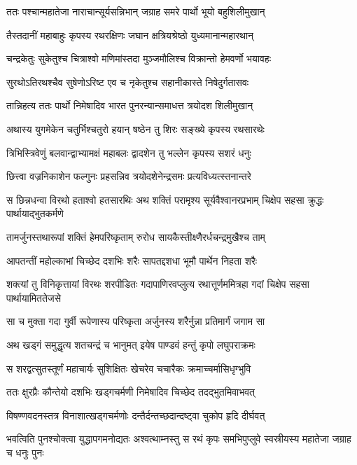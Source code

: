 \twolineshloka
{ततः पश्चान्महातेजा नाराचान्सूर्यसन्निभान्}
{जग्राह समरे पार्थो भूयो बहुशिलीमुखान्}


\twolineshloka
{तैस्तदानीं महाबाहुः कृपस्य रथरक्षिणः}
{जघान क्षत्रियश्रेष्ठो युध्यमानान्महारथान्}


\twolineshloka
{चन्द्रकेतुः सुकेतुश्च चित्राश्वो मणिमांस्तदा}
{मुञ्जमौलिश्च विक्रान्तो हेमवर्णो भयावहः}


\twolineshloka
{सुरथोऽतिरथश्चैव सुषेणोऽरिष्ट एव च}
{नृकेतुश्च सहानीकास्ते निषेदुर्गतासवः}


\twolineshloka
{तान्निहत्य ततः पार्थो निमेषादिव भारत}
{पुनरन्यान्समाधत्त त्रयोदश शिलीमुखान्}


\twolineshloka
{अथास्य युगमेकेन चतुर्भिश्चतुरो हयान्}
{षष्ठेन तु शिरः सङ्ख्ये कृपस्य रथसारथेः}


\twolineshloka
{त्रिभिस्त्रिवेणुं बलवान्द्वाभ्यामक्षं महाबलः}
{द्वादशेन तु भल्लेन कृपस्य सशरं धनुः}


\twolineshloka
{छित्त्वा वज्रनिकाशेन फल्गुनः प्रहसन्निव}
{त्रयोदशेनेन्द्रसमः प्रत्यविध्यत्स्तनान्तरे}


\threelineshloka
{स छिन्नधन्वा विरथो हताश्वो हतसारथिः}
{अथ शक्तिं परामृश्य सूर्यवैश्वानरप्रभाम्}
{चिक्षेप सहसा क्रुद्धः पार्थायाद्भुतकर्मणे}


\twolineshloka
{तामर्जुनस्तथारूपां शक्तिं हेमपरिष्कृताम्}
{रुरोध सायकैस्तीक्ष्णैरर्धचन्द्रमुखैश्च ताम्}


\twolineshloka
{आपतन्तीं महोल्काभां चिच्छेद दशभिः शरैः}
{सापतद्दशधा भूमौ पार्थेन निहता शरैः}


\threelineshloka
{शक्त्यां तु विनिकृत्तायां विरथः शरपीडितः}
{गदापाणिरवप्लुत्य रथात्तूर्णममित्रहा}
{गदां चिक्षेप सहसा पार्थायामिततेजसे}


\twolineshloka
{सा च मुक्ता गदा गुर्वी रूपेणास्य परिष्कृता}
{अर्जुनस्य शरैर्नुन्ना प्रतिमार्गं जगाम सा}


\twolineshloka
{अथ खड्गं समुद्धृत्य शतचन्द्रं च भानुमत्}
{इयेष पाण्डवं हन्तुं कृपो लघुपराक्रमः}


\twolineshloka
{स शरद्वत्सुतस्तूर्णं महाचार्यः सुशिक्षितः}
{खेचरेव चचारैकः क्रमाच्चर्मासिधृग्भुवि}


\twolineshloka
{ततः क्षुरप्रैः कौन्तेयो दशभिः खड्गचर्मणी}
{निमेषादिव चिच्छेद तदद्भुतमिवाभवत्}


\twolineshloka
{विषण्णवदनस्तत्र विनाशात्खड्गचर्मणोः}
{दन्तैर्दन्तच्छदान्दष्ट्वा चुकोप हृदि दीर्घवत्}


\threelineshloka
{भवत्विति पुनश्चोक्त्वा युद्धापगमनोद्यतः}
{अश्वत्थाम्नस्तु स रथं कृपः समभिपुप्लुवे}
{स्वस्रीयस्य महातेजा जग्राह च धनुः पुनः}


